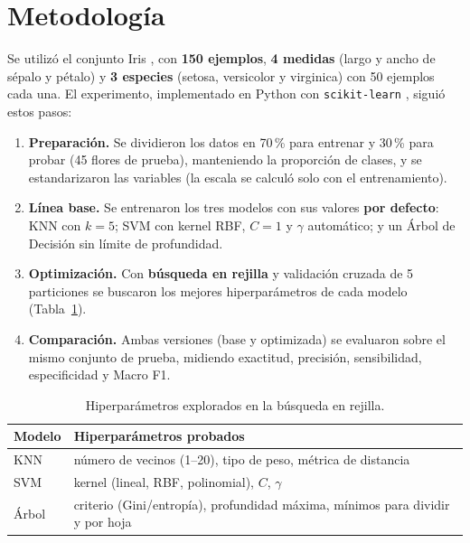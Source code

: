 \documentclass[11pt,letterpaper,twoside]{article}
\begin{document}
\section{Metodología}
\label{sec:metodologia}
Se utilizó el conjunto Iris \cite{dua2019uci}, con \textbf{150 ejemplos}, \textbf{4 medidas} (largo y ancho de sépalo y pétalo) y \textbf{3 especies} (setosa, versicolor y virginica) con 50 ejemplos cada una. El experimento, implementado en Python con \texttt{scikit-learn} \cite{scikitlearn2011}, siguió estos pasos:

\begin{enumerate}[leftmargin=*]
  \item \textbf{Preparación.} Se dividieron los datos en 70\,\% para entrenar y 30\,\% para probar (45 flores de prueba), manteniendo la proporción de clases, y se estandarizaron las variables (la escala se calculó solo con el entrenamiento).
  \item \textbf{Línea base.} Se entrenaron los tres modelos con sus valores \textbf{por defecto}: KNN con $k=5$; SVM con kernel RBF, $C=1$ y $\gamma$ automático; y un Árbol de Decisión sin límite de profundidad.
  \item \textbf{Optimización.} Con \textbf{búsqueda en rejilla} y validación cruzada de 5 particiones se buscaron los mejores hiperparámetros de cada modelo (Tabla~\ref{tab:grids}).
  \item \textbf{Comparación.} Ambas versiones (base y optimizada) se evaluaron sobre el mismo conjunto de prueba, midiendo exactitud, precisión, sensibilidad, especificidad y Macro F1.
\end{enumerate}

\begin{table}[H]
\centering
\caption{Hiperparámetros explorados en la búsqueda en rejilla.}
\label{tab:grids}
\begin{tabular}{ll}
\toprule
\textbf{Modelo} & \textbf{Hiperparámetros probados} \\
\midrule
KNN   & número de vecinos (1--20), tipo de peso, métrica de distancia \\
SVM   & kernel (lineal, RBF, polinomial), $C$, $\gamma$ \\
Árbol & criterio (Gini/entropía), profundidad máxima, mínimos para dividir y por hoja \\
\bottomrule
\end{tabular}
\end{table}
\end{document}
